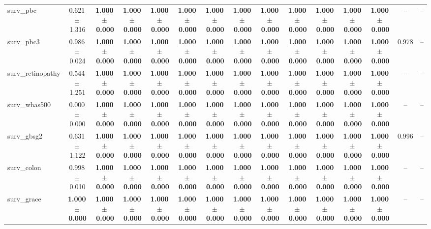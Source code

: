 \documentclass[8pt]{extarticle}
\begin{document}
\begin{longtable}{l*{14}{c}}
surv\_pbc & 0.621\,$\pm$\,1.316 & \textbf{1.000\,$\pm$\,0.000} & \textbf{1.000\,$\pm$\,0.000} & \textbf{1.000\,$\pm$\,0.000} & \textbf{1.000\,$\pm$\,0.000} & \textbf{1.000\,$\pm$\,0.000} & \textbf{1.000\,$\pm$\,0.000} & \textbf{1.000\,$\pm$\,0.000} & \textbf{1.000\,$\pm$\,0.000} & \textbf{1.000\,$\pm$\,0.000} & \textbf{1.000\,$\pm$\,0.000} & \textbf{1.000\,$\pm$\,0.000} & -- & -- \\
surv\_pbc3 & 0.986\,$\pm$\,0.024 & \textbf{1.000\,$\pm$\,0.000} & \textbf{1.000\,$\pm$\,0.000} & \textbf{1.000\,$\pm$\,0.000} & \textbf{1.000\,$\pm$\,0.000} & \textbf{1.000\,$\pm$\,0.000} & \textbf{1.000\,$\pm$\,0.000} & \textbf{1.000\,$\pm$\,0.000} & \textbf{1.000\,$\pm$\,0.000} & \textbf{1.000\,$\pm$\,0.000} & \textbf{1.000\,$\pm$\,0.000} & \textbf{1.000\,$\pm$\,0.000} & 0.978 & -- \\
surv\_retinopathy & 0.544\,$\pm$\,1.251 & \textbf{1.000\,$\pm$\,0.000} & \textbf{1.000\,$\pm$\,0.000} & \textbf{1.000\,$\pm$\,0.000} & \textbf{1.000\,$\pm$\,0.000} & \textbf{1.000\,$\pm$\,0.000} & \textbf{1.000\,$\pm$\,0.000} & \textbf{1.000\,$\pm$\,0.000} & \textbf{1.000\,$\pm$\,0.000} & \textbf{1.000\,$\pm$\,0.000} & \textbf{1.000\,$\pm$\,0.000} & \textbf{1.000\,$\pm$\,0.000} & -- & -- \\
surv\_whas500 & 0.000\,$\pm$\,0.000 & \textbf{1.000\,$\pm$\,0.000} & \textbf{1.000\,$\pm$\,0.000} & \textbf{1.000\,$\pm$\,0.000} & \textbf{1.000\,$\pm$\,0.000} & \textbf{1.000\,$\pm$\,0.000} & \textbf{1.000\,$\pm$\,0.000} & \textbf{1.000\,$\pm$\,0.000} & \textbf{1.000\,$\pm$\,0.000} & \textbf{1.000\,$\pm$\,0.000} & \textbf{1.000\,$\pm$\,0.000} & \textbf{1.000\,$\pm$\,0.000} & -- & -- \\
surv\_gbsg2 & 0.631\,$\pm$\,1.122 & \textbf{1.000\,$\pm$\,0.000} & \textbf{1.000\,$\pm$\,0.000} & \textbf{1.000\,$\pm$\,0.000} & \textbf{1.000\,$\pm$\,0.000} & \textbf{1.000\,$\pm$\,0.000} & \textbf{1.000\,$\pm$\,0.000} & \textbf{1.000\,$\pm$\,0.000} & \textbf{1.000\,$\pm$\,0.000} & \textbf{1.000\,$\pm$\,0.000} & \textbf{1.000\,$\pm$\,0.000} & \textbf{1.000\,$\pm$\,0.000} & 0.996 & -- \\
surv\_colon & 0.998\,$\pm$\,0.010 & \textbf{1.000\,$\pm$\,0.000} & \textbf{1.000\,$\pm$\,0.000} & \textbf{1.000\,$\pm$\,0.000} & \textbf{1.000\,$\pm$\,0.000} & \textbf{1.000\,$\pm$\,0.000} & \textbf{1.000\,$\pm$\,0.000} & \textbf{1.000\,$\pm$\,0.000} & \textbf{1.000\,$\pm$\,0.000} & \textbf{1.000\,$\pm$\,0.000} & \textbf{1.000\,$\pm$\,0.000} & \textbf{1.000\,$\pm$\,0.000} & -- & -- \\
surv\_grace & \textbf{1.000\,$\pm$\,0.000} & \textbf{1.000\,$\pm$\,0.000} & \textbf{1.000\,$\pm$\,0.000} & \textbf{1.000\,$\pm$\,0.000} & \textbf{1.000\,$\pm$\,0.000} & \textbf{1.000\,$\pm$\,0.000} & \textbf{1.000\,$\pm$\,0.000} & \textbf{1.000\,$\pm$\,0.000} & \textbf{1.000\,$\pm$\,0.000} & \textbf{1.000\,$\pm$\,0.000} & \textbf{1.000\,$\pm$\,0.000} & \textbf{1.000\,$\pm$\,0.000} & -- & -- \\

\end{longtable}
\end{document}
